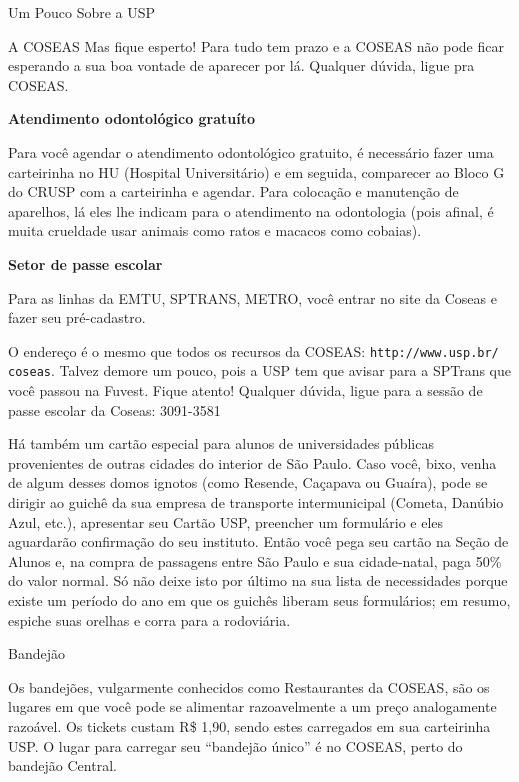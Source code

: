 \begin{secao}{Um Pouco Sobre a USP}
\begin{subsecao}{A COSEAS}
Mas fique esperto! Para tudo tem prazo e a COSEAS não pode ficar esperando a sua
boa vontade de aparecer por lá. Qualquer dúvida, ligue pra COSEAS.

{\bf Atendimento odontológico gratuíto}

Para você agendar o atendimento odontológico gratuito, é necessário fazer uma
carteirinha no HU (Hospital Universitário) e em seguida, comparecer ao Bloco G
do CRUSP com a carteirinha e agendar. Para colocação e manutenção de aparelhos,
lá eles lhe indicam para o atendimento na odontologia (pois afinal, é muita
crueldade usar animais como ratos e macacos como cobaias). 

{\bf Setor de passe escolar}

Para as linhas da EMTU, SPTRANS, METRO, você entrar no site da Coseas e fazer
seu pré-cadastro. 

O endereço é o mesmo que todos os recursos da COSEAS: {\tt http://www.usp.br/
coseas}. Talvez demore um pouco, pois a USP tem 
que avisar para a SPTrans que você passou na Fuvest. Fique atento! Qualquer 
dúvida, ligue para a sessão de passe escolar da Coseas: 3091-3581 

Há também um cartão especial para alunos de universidades públicas provenientes
de outras cidades do interior de São Paulo. Caso você, bixo, venha de algum desses domos ignotos
(como Resende, Caçapava ou Guaíra), pode se dirigir ao guichê da sua empresa de
transporte intermunicipal (Cometa, Danúbio Azul, etc.), apresentar seu Cartão USP,
preencher um formulário e eles aguardarão confirmação do seu instituto. Então
você pega seu cartão na Seção de Alunos e, na compra de passagens entre São Paulo
e sua cidade-natal, paga 50\% do valor normal. Só não deixe isto por último na
sua lista de necessidades porque existe um período do ano em que os guichês
liberam seus formulários; em resumo, espiche suas orelhas e corra para a rodoviária.

\end{subsecao}

\pagebreak
{}

\begin{subsecao}{Bandejão}

Os bandejões, vulgarmente conhecidos como Restaurantes da COSEAS, são os lugares
em que você pode se alimentar razoavelmente a um preço analogamente razoável.
Os tickets custam R\$ 1,90, sendo estes carregados em sua carteirinha USP. O 
lugar para carregar seu ``bandejão único'' é no COSEAS, perto do bandejão 
Central.


\end{subsecao}
\end{secao}
